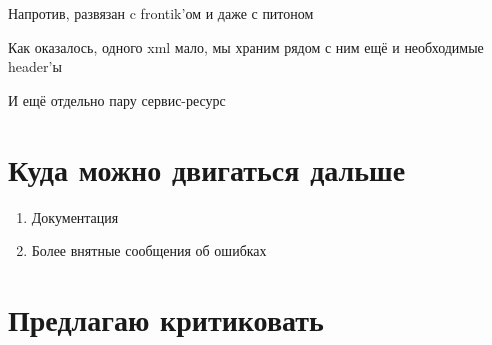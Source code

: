 \documentclass[12pt]{article}
\begin{document}
Напротив, развязан c frontik'ом и даже с питоном

Как оказалось, одного xml мало, мы храним рядом с ним ещё и необходимые header'ы

И ещё отдельно пару сервис-ресурс

\section{Куда можно двигаться дальше}

\begin{enumerate}
\item Документация
\item Более внятные сообщения об ошибках
\end{enumerate}

\section{Предлагаю критиковать}
\end{document}

